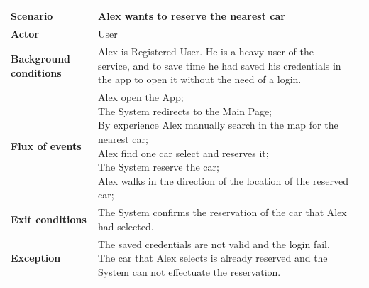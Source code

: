 \documentclass[a4paper]{article}
\begin{document}
\begin{tabular}{ |  l  |   l |  l  |  }
\hline
	\textbf { \textbf{Scenario}} & Alex wants to reserve the nearest car\\ \hline
	 \textbf{Actor}& User\\ \hline
	\textbf{Background conditions}&\parbox[t]{8cm}{Alex is Registered User. He is a heavy user of the service, and to save time he had saved his credentials in the app to open it without the need of a login. } \\ \hline
	\textbf{Flux of events} & \parbox[t]{8cm}{\textbullet  Alex open the App;\\\textbullet  The System redirects to the Main Page;\\\textbullet By experience Alex manually search in the map for the nearest car;\\\textbullet Alex find one car select and reserves it;\\\textbullet 	The System reserve the car;\\\textbullet  Alex walks in the direction of the location of the reserved car; }
  \\ \hline
	\textbf{Exit conditions} &\parbox[t]{8cm}{ The System confirms the reservation of the car that Alex had selected.}\\ \hline
	\textbf{Exception} & \parbox[t]{8cm}{The saved credentials are not valid and the login fail.\\
The car that Alex selects is already reserved and the System can not effectuate the reservation.
}\\ \hline

\end{tabular}
\newline
\end{document}
